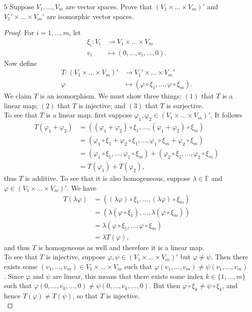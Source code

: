\documentclass[11pt]{extarticle}
\newenvironment{problem}[1]{\begin{prob*}{#1}{}}{\end{prob*}}
\newcommand{\F}{\mathbb{F}}
\begin{document}
\begin{problem}{5}
Suppose $V_1,\dots,V_m$ are vector spaces.  Prove that $(V_1\times\dots\times V_m)'$ and $V_1'\times\dots\times V_m'$ are isomorphic vector spaces.
\end{problem}
\begin{proof}
For $i = 1,\dots, m$, let
\begin{align*}
\xi_i:V_i&\to V_1\times\dots \times V_m\\
v_i &\mapsto (0, \dots, v_i, \dots, 0).
\end{align*}
Now define
\begin{align*}
T: (V_1\times\dots\times V_m)' &\to V_1'\times\dots\times V_m'\\
\varphi &\mapsto \left(\varphi\circ\xi_1, \dots, \varphi\circ\xi_m\right).
\end{align*}
We claim $T$ is an isomorphism.  We must show three things: $(1)$ that $T$ is a linear map; $(2)$ that $T$ is injective; and $(3)$ that $T$ is surjective.\\
\indent To see that $T$ is a linear map, first suppose $\varphi_1,\varphi_2\in (V_1\times\dots\times V_m)'$.  It follows
\begin{align*}
T(\varphi_1 + \varphi_2) &=  \left((\varphi_1 + \varphi_2)\circ\xi_1, \dots, (\varphi_1+\varphi_2)\circ\xi_m\right)\\
&= \left(\varphi_1\circ\xi_1 + \varphi_2\circ\xi_1, \dots, \varphi_1\circ\xi_m + \varphi_2\circ\xi_m\right)\\
&=(\varphi_1\circ\xi_1,\dots,\varphi_1\circ\xi_m) + (\varphi_2\circ\xi_1,\dots,\varphi_2\circ\xi_m)\\
&=T(\varphi_1) + T(\varphi_2),
\end{align*}
thus $T$ is additive.  To see that it is also homogeneous, suppose $\lambda\in\F$ and $\varphi\in(V_1\times\dots\times V_m)'$.  We have
\begin{align*}
T(\lambda\varphi) &= \left((\lambda\varphi)\circ\xi_1, \dots, (\lambda\varphi)\circ\xi_m\right)\\
&= \left(\lambda(\varphi\circ\xi_1), \dots, \lambda(\varphi\circ\xi_m)\right)\\
&= \lambda\left(\varphi\circ\xi_1, \dots, \varphi\circ\xi_m\right)\\
&= \lambda T(\varphi),
\end{align*}
and thus $T$ is homogeneous as well and therefore it is a linear map.\\
\indent To see that $T$ is injective, suppose $\varphi,\psi\in (V_1\times\dots\times V_m)'$ but $\varphi \neq \psi$.  Then there exists some $(v_1,\dots,v_m)\in V_1\times\dots\times V_m$ such that $\varphi(v_1,\dots,v_m)\neq \psi(v_1,\dots,v_m)$.  Since $\varphi$ and $\psi$ are linear, this means that there exists some index $k\in\{1,\dots,m\}$ such that $\varphi(0,\dots,v_k,\dots, 0)\neq\psi(0,\dots,v_k,\dots,0)$.  But then $\varphi\circ\xi_k\neq \psi\circ\xi_k$, and hence $T(\varphi)\neq T(\psi)$, so that $T$ is injective.\\

\end{proof}
\end{document}
